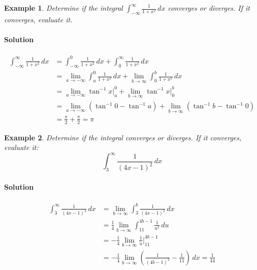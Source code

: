 \documentclass[letterpaper, 11pt, openany]{book}
\theoremstyle{mytheoremstyle}
\theoremstyle{myexamplestyle}
\newtheorem{example}{Example}[section]
\newenvironment{solution}{\paragraph{\sffamily \smaller \fontseries{b}\selectfont Solution}}{\hfill\faSquare}
\begin{document}
\begin{example}\label{e:impintdouble}
    Determine if the integral $\displaystyle \int_{-\infty}^{\infty} \frac{1}{1 + x^{2}} \, dx$ converges or diverges. If it converges, evaluate it.
    \begin{solution}
        \begin{align*}
            \int_{-\infty}^{\infty} \frac{1}{1 + x^{2}} \, dx   &= \int_{-\infty}^{0} \frac{1}{1 + x^{2}} \, dx + \int_{0}^{\infty} \frac{1}{1 + x^{2}} \, dx \\
                                                                &= \lim_{a \to -\infty} \int_{a}^{0} \frac{1}{1 + x^{2}} \, dx + \lim_{b \to \infty} \int_{0}^{b} \frac{1}{1 + x^{2}} \, dx \\
                                                                &= \lim_{a \to -\infty} \tan^{-1} x \Big|_{a}^{0} + \lim_{b \to \infty} \tan^{-1} x \Big|_{0}^{b}\\
                                                                &= \lim_{a \to -\infty} \left( \tan^{-1} 0 - \tan^{-1} a \right) + \lim_{b \to \infty} \left( \tan^{-1} b - \tan^{-1} 0 \right)\\
                                                                &= \frac{\pi}{2} + \frac{\pi}{2} = \pi
        \end{align*}    
    \end{solution}        
\end{example}

\begin{example}\label{e:impintsub2}
    Determine if the integral converges or diverges. If it converges, evaluate it:
    \[
        \int_{3}^{\infty} \frac{1}{\left( 4x - 1 \right)^{2}} \, dx
    \]    
    \begin{solution}
        \begin{align*}
            \int_{3}^{\infty} \frac{1}{\left( 4x - 1 \right)^{2}} \, dx &= \lim_{b \to \infty} \int_{3}^{b} \frac{1}{\left( 4x - 1 \right)^{2}} \, dx\\
                                                                    &= \frac{1}{4} \lim_{b \to \infty} \int_{11}^{4b - 1} \frac{1}{u^{2}} \, du\\
                                                                    &= -\frac{1}{4} \lim_{b \to \infty} \frac{1}{u}\Big|_{11}^{4b - 1}\\
                                                                    &= -\frac{1}{4} \lim_{b \to \infty} \left( \frac{1}{\left( 4b - 1 \right)^{2}} - \frac{1}{11}\right) \, dx = \frac{1}{44}
        \end{align*}
    \end{solution}
\end{example}
\end{document}
